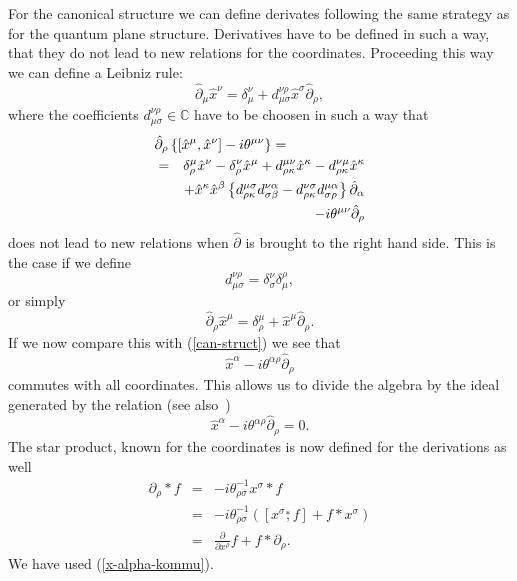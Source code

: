 \documentclass[a4paper,11pt]{article}
\def\nn{\nonumber }
\def\ka{\kappa}
\def\ds{\stackrel{*}{,}}
\def\x{\hat x}
\def\pat{\partial}
\begin{document}
For the canonical structure we can define derivates following the same strategy as for 
the quantum plane structure. Derivatives have to be defined in such a way, 
that they do not lead to new relations for the coordinates. 
Proceeding this way we can define a Leibniz rule:
\begin{equation}
  \hat{\pat}_{\mu}\x^{\nu}=\delta^{\nu}_{\mu}+d^{\nu\rho}_{\mu\sigma}\x^{\sigma}\hat{\pat}_{\rho},
\end{equation}
where the coefficients $d^{\nu\rho}_{\mu\sigma}\in\mathbb{C}$ have to be 
choosen in such a way that
\begin{eqnarray}
  \lefteqn{\hat{\pat}_{\rho}\left\{[\x^{\mu},\x^{\nu}]-i\theta^{\mu\nu}\right\}=}\nn\\
  &=& \delta^{\mu}_{\rho}\x^{\nu}-\delta^{\nu}_{\rho}\x^{\mu}+d^{\mu\nu}_{\rho\ka}\x^{\ka}-d^{\nu\mu}_{\rho\ka}\x^{\ka}\nn\\
  &&+\x^{\ka}\x^{\beta}\left\{d^{\mu\sigma}_{\rho\ka}d^{\nu\alpha}_{\sigma\beta}-d^{\nu\sigma}_{\rho\ka}d^{\mu\alpha}_{\sigma\rho}\right\}\hat{\pat}_{\alpha}\nn\\
  &&-i\theta^{\mu\nu}\hat{\pat}_{\rho}
\end{eqnarray}
does not lead to new relations when $\hat{\pat}$ is brought to the right hand side. 
This is the case if we define
\begin{equation}
  d^{\nu\rho}_{\mu\sigma}=\delta^{\nu}_{\sigma}\delta^{\rho}_{\mu},
\end{equation}
or simply
\begin{equation}
  \hat{\pat}_{\rho}\x^{\mu}=\delta^{\mu}_{\rho}+\x^{\mu}\hat{\pat}_{\rho}.
\end{equation}
If we now compare this with (\ref{can-struct}) we see that 
\begin{equation}
  \x^{\alpha}-i\theta^{\alpha\rho}\hat{\pat}_{\rho} 
\end{equation}
commutes with all coordinates. This allows us to divide the algebra by 
the ideal generated by the relation (see also~\cite{Ho,AG})
\begin{equation}
  \x^{\alpha}-i\theta^{\alpha\rho}\hat{\pat}_{\rho}=0.
\end{equation}
The star product, known for the coordinates is now defined for the 
derivations as well
\begin{eqnarray}
\label{star-deriv}
  \pat_{\rho}*f&=&-i\theta^{-1}_{\rho\sigma}x^{\sigma}*f\nn\\
  &=& -i\theta^{-1}_{\rho\sigma}\left([x^{\sigma}\ds f]+f*x^{\sigma}\right)\nn\\
  &=&\frac{\pat}{\pat x^{\rho}}f+f*\pat_{\rho}.
\end{eqnarray}
We have used (\ref{x-alpha-kommu}).
\end{document}
